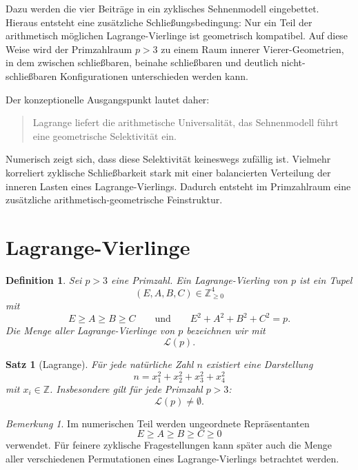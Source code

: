 \documentclass[11pt,a4paper]{article}
\newtheorem{satz}{Satz}
\newtheorem{definition}{Definition}
\theoremstyle{remark}
\newtheorem{bemerkung}{Bemerkung}
\begin{document}
	Dazu werden die vier Beiträge in ein zyklisches Sehnenmodell eingebettet. Hieraus entsteht eine zusätzliche Schließungsbedingung: Nur ein Teil der arithmetisch möglichen Lagrange-Vierlinge ist geometrisch kompatibel. Auf diese Weise wird der Primzahlraum \(p>3\) zu einem Raum innerer Vierer-Geometrien, in dem zwischen schließbaren, beinahe schließbaren und deutlich nicht-schließbaren Konfigurationen unterschieden werden kann.
	
	Der konzeptionelle Ausgangspunkt lautet daher:
	\begin{quote}
		Lagrange liefert die arithmetische Universalität, das Sehnenmodell führt eine geometrische Selektivität ein.
	\end{quote}
	
	Numerisch zeigt sich, dass diese Selektivität keineswegs zufällig ist. Vielmehr korreliert zyklische Schließbarkeit stark mit einer balancierten Verteilung der inneren Lasten eines Lagrange-Vierlings. Dadurch entsteht im Primzahlraum eine zusätzliche arithmetisch-geometrische Feinstruktur.
	
	\section{Lagrange-Vierlinge}
	
	\begin{definition}
		Sei \(p>3\) eine Primzahl. Ein \emph{Lagrange-Vierling} von \(p\) ist ein Tupel
		\[
		(E,A,B,C)\in \mathbb Z_{\ge 0}^4
		\]
		mit
		\[
		E \ge A \ge B \ge C
		\qquad\text{und}\qquad
		E^2 + A^2 + B^2 + C^2 = p.
		\]
		Die Menge aller Lagrange-Vierlinge von \(p\) bezeichnen wir mit
		\[
		\mathcal L(p).
		\]
	\end{definition}
	
	\begin{satz}[Lagrange]
		Für jede natürliche Zahl \(n\) existiert eine Darstellung
		\[
		n = x_1^2 + x_2^2 + x_3^2 + x_4^2
		\]
		mit \(x_i \in \mathbb Z\). Insbesondere gilt für jede Primzahl \(p>3\):
		\[
		\mathcal L(p)\neq\emptyset.
		\]
	\end{satz}
	
	\begin{bemerkung}
		Im numerischen Teil werden ungeordnete Repräsentanten
		\[
		E \ge A \ge B \ge C \ge 0
		\]
		verwendet. Für feinere zyklische Fragestellungen kann später auch die Menge aller verschiedenen Permutationen eines Lagrange-Vierlings betrachtet werden.
	\end{bemerkung}
	
\end{document}
